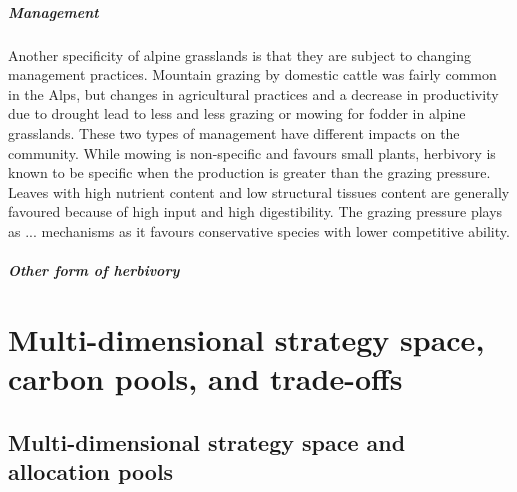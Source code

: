 \paragraph{Management}
Another specificity of alpine grasslands is that they are subject to changing management practices. Mountain grazing by domestic cattle was fairly common in the Alps, but changes in agricultural practices and a decrease in productivity due to drought lead to less and less grazing or mowing for fodder in alpine grasslands. These two types of management have different impacts on the community. While mowing is non-specific and favours small plants, herbivory is known to be specific when the production is greater than the grazing pressure. Leaves with high nutrient content and low structural tissues content are generally favoured because of high input and high digestibility. The grazing pressure plays as ... mechanisms as it favours conservative species with lower competitive ability.

\paragraph{Other form of herbivory}



\chapter{Multi-dimensional strategy space, carbon pools, and trade-offs}
\section{Multi-dimensional strategy space and allocation pools}
%

